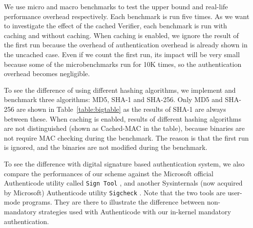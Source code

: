 We use micro and macro benchmarks to test the upper bound and
real-life performance overhead respectively.
Each benchmark is run five times.
As we want to investigate the effect of the cached Verifier,
each benchmark is run with caching and without caching.
When caching is enabled, we ignore the result of the first run because
the overhead of authentication overhead is already shown in the uncached case.
Even if we count the first run, its impact will be very small because
some of the microbenchmarks run for 10K times, so the authentication
overhead becomes negligible.

To see the difference of using different hashing algorithms, we implement
and benchmark three algorithms: MD5, SHA-1 and SHA-256.
Only MD5 and SHA-256 are shown in Table~\ref{table:bigtable} as
the results of SHA-1 are always between these.
When caching is enabled, results of different hashing algorithms are
not distinguished (shown as Cached-MAC in the table),
because binaries are not require MAC checking during the benchmark.
The reason is that the first run is ignored, and the binaries are not modified
during the benchmark.

To see the difference with digital signature based authentication system,
we also compare the performances of our scheme against
the Microsoft official Authenticode utility called {\tt Sign Tool} \cite{signtool},
and another Sysinternals (now acquired by Microsoft) Authenticode utility
{\tt Sigcheck} \cite{sigcheck}.
Note that the two tools are user-mode programs.
They are there to illustrate the difference between non-mandatory strategies
used with Authenticode with our in-kernel mandatory authentication.


